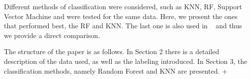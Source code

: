 Different methods of classification were considered, such as KNN, RF, Support Vector Machine and were tested for the same data. Here, we present the ones that performed best, the RF and KNN. The last one is also used in ~\cite{Chatterjee:2019avs} and thus we provide a direct comparison. 

The structure of the paper is as follows. In Section 2 there is a detailed description of the data used, as well as the labeling introduced. In Section 3, the classification methods, namely Random Forest and KNN are presented. +   
